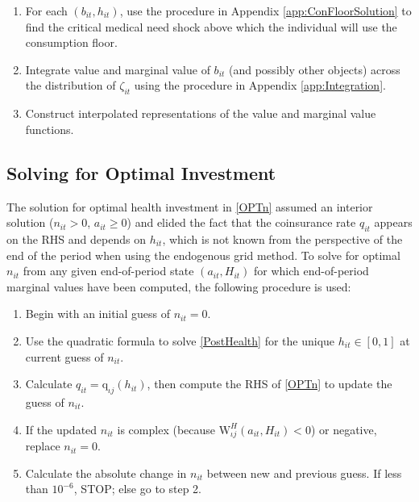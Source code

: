 \documentclass[12pt,pdftex,letterpaper]{article}
\newcommand{\Type}{\iota}
\newcommand{\Health}{h}
\newcommand{\PostHealth}{H}
\newcommand{\PostValue}{\text{W}}
\newcommand{\Invst}{n}
\newcommand{\Bank}{b}
\newcommand{\Assets}{a}
\newcommand{\Copay}{q}
\newcommand{\CopayFunc}{\text{\Copay}}
\newcommand{\Age}{j}
\begin{document}
\begin{enumerate}
\item For each $(\Bank_{it},\Health_{it})$, use the procedure in Appendix \ref{app:ConFloorSolution} to find the critical medical need shock above which the individual will use the consumption floor.

\item Integrate value and marginal value of $\Bank_{it}$ (and possibly other objects) across the distribution of $\zeta_{it}$ using the procedure in Appendix \ref{app:Integration}.

\item Construct interpolated representations of the value and marginal value functions.
\end{enumerate}


\subsection{Solving for Optimal Investment}
\label{app:OPTn}

The solution for optimal health investment in \eqref{OPTn} assumed an interior solution ($\Invst_{it} > 0$, $\Assets_{it} \geq 0$) and elided the fact that the coinsurance rate $\Copay_{it}$ appears on the RHS and depends on $\Health_{it}$, which is not known from the perspective of the end of the period when using the endogenous grid method.  To solve for optimal $\Invst_{it}$ from any given end-of-period state $(\Assets_{it},\PostHealth_{it})$ for which end-of-period marginal values have been computed, the following procedure is used:
\begin{enumerate}
\item Begin with an initial guess of $\Invst_{it}=0$.

\item Use the quadratic formula to solve \eqref{PostHealth} for the unique $\Health_{it} \in [0,1]$ at current guess of $\Invst_{it}$.

\item Calculate $\Copay_{it} = \CopayFunc_{\Type \Age}(\Health_{it})$, then compute the RHS of \eqref{OPTn} to update the guess of $\Invst_{it}$.

\item If the updated $\Invst_{it}$ is complex (because $\PostValue^\PostHealth_{\Type \Age}(\Assets_{it},\PostHealth_{it}) < 0$) or negative, replace $\Invst_{it} = 0$.

\item Calculate the absolute change in $\Invst_{it}$ between new and previous guess.  If less than $10^{-6}$, STOP; else go to step 2.
\end{enumerate}
\end{document}
